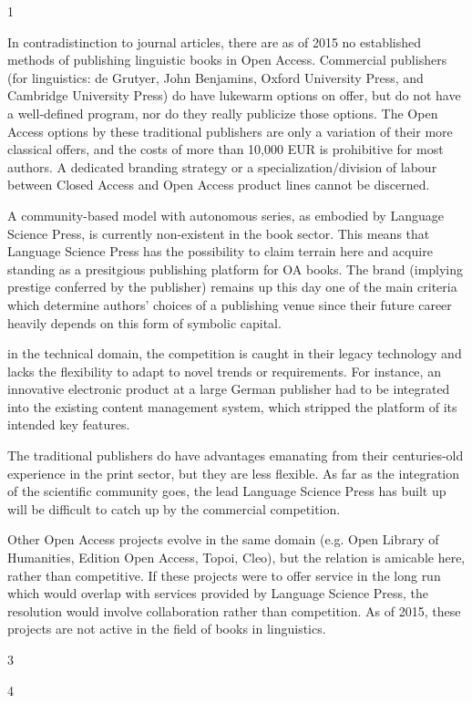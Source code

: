 \documentclass[output=guidelines,draftmode]{langscibook}
\newcommand{\background}[1]{ 
  \vspace{5mm}
  \renewcommand{\tblslinecolour}{lsDarkBlue}
  \tblssy[red]{explore2}{Background}{#1}
}
\newcommand{\langscisolution}[1]{
  \renewcommand{\tblslinecolour}{lsLightBlue}
  \tblssy{langsci}{LangSci solution}{#1}
}
\newcommand{\evaluation}[1]{
  \renewcommand{\tblslinecolour}{lsLightOrange}
  \tblssy{receipt}{Evaluation}{#1}
}
\newcommand{\othersolutions}[1]{
  \renewcommand{\tblslinecolour}{lsDarkGreenOne}
  \tblssy{more}{Other solutions}{#1}
}
\renewcommand{\tblssy}[4][black!12]{%
  \renewcommand{\langscisymbol}{#2}\renewcommand{\tblsboxcolor}{#1}
  \begin{mdframed}[style=yellowexercise,frametitle={#3}]
    #4
  \end{mdframed}
}
\begin{document}
\background{1}
\langscisolution{
In contradistinction to journal articles, there are as of 2015 no established methods of publishing linguistic books in Open Access. Commercial publishers (for linguistics: de Grutyer, John Benjamins, Oxford University Press, and Cambridge University Press) do have lukewarm options on offer, but do not have a well-defined program, nor do they really publicize those options. The Open Access options by these traditional publishers are only a variation of their more classical offers, and the costs of more than 10,000 EUR is prohibitive for most authors. A dedicated branding strategy or a specialization/division of labour between Closed Access and Open Access product lines cannot be discerned.

A community-based model with autonomous series, as embodied by Language Science Press, is currently non-existent in the book sector. This means that Language Science Press has the possibility to claim terrain here and acquire standing as a presitgious publishing platform for OA books.  The brand (implying prestige conferred by the publisher) remains up this day one of the main criteria which determine authors' choices of a publishing venue since their future career heavily depends on this form of symbolic capital. 

in the technical domain, the competition is caught in their legacy technology and lacks the flexibility to adapt to novel trends or requirements. For instance, an innovative electronic product at a large German publisher had to be integrated into the existing content management system, which stripped the platform of its intended key features. 

The traditional publishers do have advantages emanating from their centuries-old experience in the print sector, but they are less flexible. As far as the integration of the scientific community goes, the lead Language Science Press has built up will be difficult to catch up by the commercial competition.  

Other Open Access projects evolve in the same domain (e.g. Open Library of Humanities, Edition Open Access, Topoi, Cleo), but the relation is amicable here, rather than competitive.
If these projects were to offer service in the long run which would overlap with services provided by Language Science Press, the resolution would involve collaboration rather than competition. As of 2015, these projects are not active in the field of books in linguistics. 
}
\evaluation{3}
\othersolutions{4}
 
\end{document}
